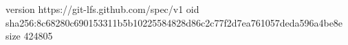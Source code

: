 version https://git-lfs.github.com/spec/v1
oid sha256:8c68280c690153311b5b10225584828d86c2c77f2d7ea761057deda596a4be8e
size 424805
